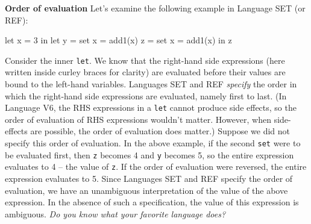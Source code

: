 \begin{minipage}[t]{\sw}
\slidenumber
\LARGE
{\bf Order of evaluation}\exx
\Large
Let's examine the following example in Language SET (or REF):
\begin{qv}
let
  x = 3
in
  let
    y = {set x = add1(x)}
    z = {set x = add1(x)}
  in
    z
\end{qv}
Consider the inner \verb'let'.
We know that the right-hand side expressions
(here written inside curley braces for clarity)
are evaluated before their values are bound
to the left-hand variables.
Languages SET and REF {\em specify} the order
in which the right-hand side expressions are evaluated,
namely first to last.
(In Language V6, the RHS expressions in a \verb'let'
cannot produce side effects, so the order of evaluation
of RHS expressions wouldn't matter.
However, when side-effects are possible,
the order of evaluation does matter.)\exx
Suppose we did not specify this order of evaluation.
In the above example,
if the second \verb'set' were to be evaluated first,
then \verb'z' becomes 4 and \verb'y' becomes 5,
so the entire expression evaluates to 4 -- the value of \verb'z'.
If the order of evaluation were reversed,
the entire expression evaluates to 5.
Since Languages SET and REF specify the order of evaluation,
we have an unambiguous interpretation
of the value of the above expression.
In the absence of such a specification,
the value of this expression is ambiguous.
{\em Do you know what your favorite language does?}
\end{minipage}
\clearpage
